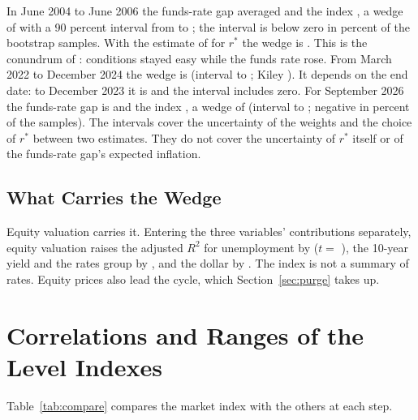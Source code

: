\documentclass[11pt]{article}
\newcommand{\rs}{r^{*}}
\begin{document}
\begin{appendices}


In June 2004 to June 2006 the funds-rate gap averaged  and the index , a wedge of  with a 90 percent interval from  to ; the interval is below zero in  percent of the bootstrap samples. With the estimate of \citet{kiley2020} for $\rs$ the wedge is . This is the conundrum of \citet{hatzius2010}: conditions stayed easy while the funds rate rose. From March 2022 to December 2024 the wedge is  (interval  to ; Kiley ). It depends on the end date: to December 2023 it is  and the interval includes zero. For September 2026 the funds-rate gap is  and the index , a wedge of  (interval  to ; negative in  percent of the samples). The intervals cover the uncertainty of the weights and the choice of $\rs$ between two estimates. They do not cover the uncertainty of $\rs$ itself or of the funds-rate gap's expected inflation.

\subsection{What Carries the Wedge}\label{sec:carries}
Equity valuation carries it. Entering the three variables' contributions separately, equity valuation raises the adjusted $R^2$ for unemployment by  ($t=$ ), the 10-year yield and the rates group by , and the dollar by . The index is not a summary of rates. Equity prices also lead the cycle, which Section~\ref{sec:purge} takes up.
\FloatBarrier


\section{Correlations and Ranges of the Level Indexes}\label{app:levels}
Table~\ref{tab:compare} compares the market index with the others at each step.




\end{appendices}
\end{document}
